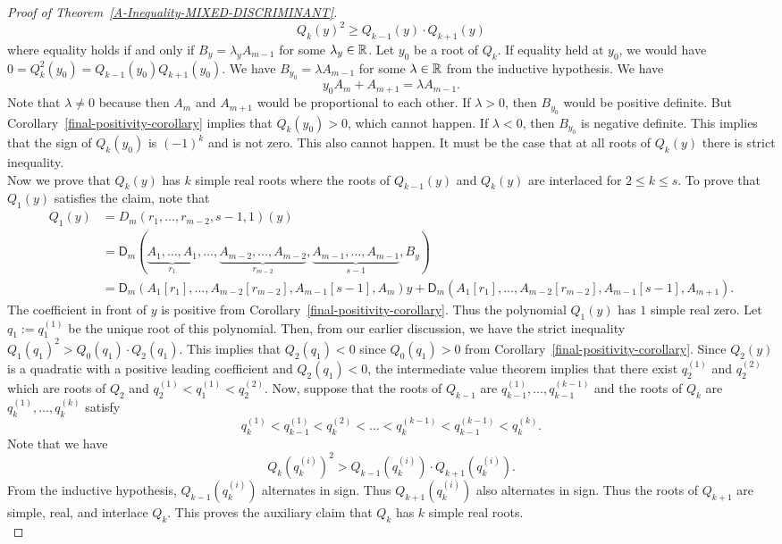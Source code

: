 \documentclass{puthesis-UG}
\begin{document}
\begin{proof}[Proof of Theorem~\ref{A-Inequality-MIXED-DISCRIMINANT}]
	\[
		Q_k(y)^2 \geq Q_{k-1}(y) \cdot Q_{k+1}(y)
	\] 
	where equality holds if and only if $B_y = \lambda_y A_{m-1}$ for some $\lambda_y \in \mathbb{R}$. Let $y_0$ be a root of $Q_k$. If equality held at $y_0$, we would have $0 = Q_k^2(y_0) = Q_{k-1}(y_0) Q_{k+1}(y_0)$. We have $B_{y_0} = \lambda A_{m-1}$ for some $\lambda \in \mathbb{R}$ from the inductive hypothesis. We have 
	\[
		y_0 A_m + A_{m+1} = \lambda A_{m-1}.
	\]
	Note that $\lambda \neq 0$ because then $A_m$ and $A_{m+1}$ would be proportional to each other. If $\lambda > 0$, then $B_{y_0}$ would be positive definite. But Corollary~\ref{final-positivity-corollary} implies that $Q_k(y_0) > 0$, which cannot happen. If $\lambda < 0$, then $B_{y_0}$ is negative definite. This implies that the sign of $Q_k(y_0)$ is $(-1)^k$ and is not zero. This also cannot happen. It must be the case that at all roots of $Q_k(y)$ there is strict inequality. \\

	Now we prove that $Q_k(y)$ has $k$ simple real roots where the roots of $Q_{k-1}(y)$ and $Q_k(y)$ are interlaced for $2 \leq k \leq s$. To prove that $Q_1(y)$ satisfies the claim, note that 
	\begin{align*}
		Q_1(y) & = D_m(r_1, \ldots, r_{m-2}, s-1, 1)(y) \\
		& = \mathsf{D}_m (\underbrace{A_1, \ldots, A_1}_{r_1}, \ldots, \underbrace{A_{m-2}, \ldots, A_{m-2}}_{r_{m-2}}, \underbrace{A_{m-1}, \ldots, A_{m-1}}_{s-1}, B_y) \\
		& = \mathsf{D}_m (A_1[r_1], \ldots, A_{m-2}[r_{m-2}], A_{m-1}[s-1], A_m) y + \mathsf{D}_m (A_1[r_1], \ldots, A_{m-2}[r_{m-2}], A_{m-1}[s-1], A_{m+1}).
	\end{align*}
	The coefficient in front of $y$ is positive from Corollary~\ref{final-positivity-corollary}. Thus the polynomial $Q_1(y)$ has $1$ simple real zero. Let $q_1 := q_1^{(1)}$ be the unique root of this polynomial. Then, from our earlier discussion, we have the strict inequality $Q_1(q_1)^2 > Q_0(q_1) \cdot Q_2(q_1)$. This implies that $Q_2(q_1) < 0$ since $Q_0(q_1) > 0$ from Corollary~\ref{final-positivity-corollary}. Since $Q_2(y)$ is a quadratic with a positive leading coefficient and $Q_2(q_1) < 0$, the intermediate value theorem implies that there exist $q_2^{(1)}$ and $q_2^{(2)}$ which are roots of $Q_2$ and $q_2^{(1)} < q_1^{(1)} < q_2^{(2)}$. Now, suppose that the roots of $Q_{k-1}$ are $q_{k-1}^{(1)}, \ldots, q_{k-1}^{(k-1)}$ and the roots of $Q_k$ are $q_k^{(1)}, \ldots, q_k^{(k)}$ satisfy 
	\[
		q_k^{(1)} < q_{k-1}^{(1)} < q_k^{(2)} < \ldots < q_k^{(k-1)} < q_{k-1}^{(k-1)} < q_k^{(k)}.
	\]
	Note that we have 
	\[
		Q_k(q_k^{(i)})^2 > Q_{k-1}(q_k^{(i)}) \cdot Q_{k+1}(q_k^{(i)}).
	\]
	From the inductive hypothesis, $Q_{k-1}(q_k^{(i)})$ alternates in sign. Thus $Q_{k+1}(q_k^{(i)})$ also alternates in sign. Thus the roots of $Q_{k+1}$ are simple, real, and interlace $Q_k$. This proves the auxiliary claim that $Q_k$ has $k$ simple real roots. \\


\end{proof}
\end{document}
